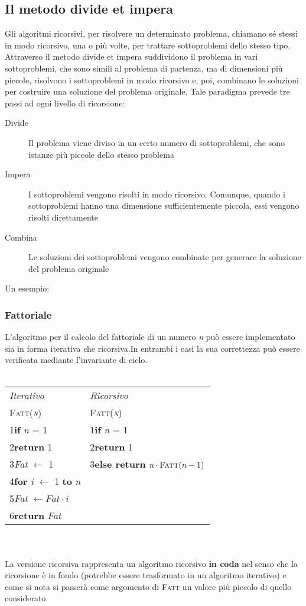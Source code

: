 \documentclass[10pt, a4paper]{report}
\newcommand\firsttab[1][0.5cm]{\hspace*{#1}}
\newcommand\secondtab[1][1cm]{\hspace*{#1}}
\begin{document}
\subsection{Il metodo divide et impera}
Gli algoritmi ricorsivi, per risolvere un determinato problema, chiamano sé stessi in modo ricorsivo, una o più volte, per trattare sottoproblemi dello stesso tipo. Attraverso il metodo divide et impera suddividono il problema in vari sottoproblemi, che sono simili al problema di partenza, ma di dimensioni più piccole, risolvono i sottoproblemi in modo ricorsivo e, poi, combinano le soluzioni per costruire una soluzione del problema originale. Tale paradigma prevede tre passi ad ogni livello di ricorsione:
\begin{description}
\item[Divide] Il problema viene diviso in un certo numero di sottoproblemi, che sono istanze più piccole dello stesso problema
\item[Impera]I sottoproblemi vengono risolti in modo ricorsivo. Comunque, quando i sottoproblemi hanno una dimensione sufficientemente piccola, essi vengono risolti direttamente
\item[Combina]Le soluzioni dei sottoproblemi vengono combinate per generare la soluzione del problema originale
\end{description}
Un esempio:
\subsubsection{Fattoriale}
L'algoritmo per il calcolo del fattoriale di un numero \textit{n} può essere implementato sia in forma iterativa che ricorsiva.\;In entrambi i casi la sua correttezza può essere verificata mediante l'invariante di ciclo.\\\\
\begin{tabular}{ll}
\em Iterativo & \em Ricorsivo \\
\textsc{Fatt(\textit{n})} & \textsc{Fatt(\textit{n})}\\
1\firsttab \textbf{if} \textit{n} = 1 &1\firsttab \textbf{if} \textit{n} = 1\\
2\secondtab \textbf{return} 1 &2\secondtab \textbf{return} 1\\
3\firsttab \textit{Fat} $\leftarrow$ 1&3\firsttab \textbf{else return} $\textit{n} \cdot \textsc{Fatt}(n-1)$\\
4\firsttab \textbf{for} \textit{i} $\leftarrow$ 1 \textbf{to} \textit{n}\\
5\secondtab \textit{Fat} $\leftarrow \textit{Fat} \cdot \textit{i}$\\
6\firsttab \textbf{return} \textit{Fat}\\
\end{tabular}
\\\\La versione ricorsiva rappresenta un algoritmo ricorsivo \textbf{in coda} nel senso che la ricorsione è in fondo (potrebbe essere trasformato in un algoritmo iterativo) e come si nota si passerà come argomento di \textsc{Fatt} un valore più piccolo di quello considerato.
\end{document}
